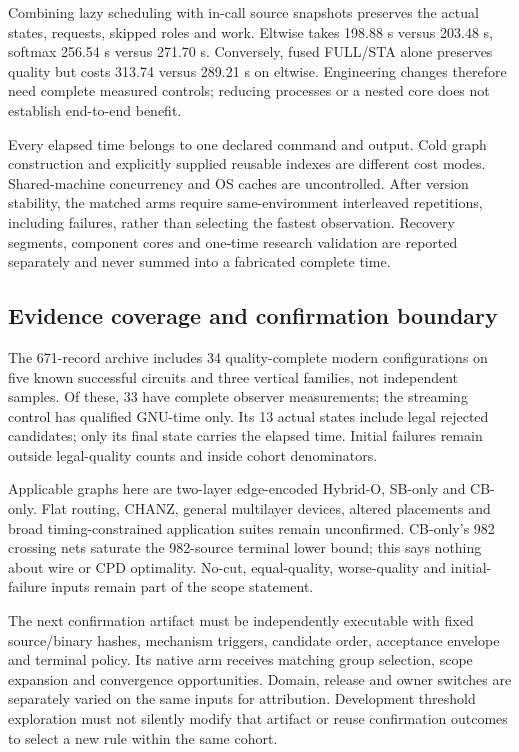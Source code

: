 \documentclass[conference,10pt]{IEEEtran}
\begin{document}
Combining lazy scheduling with in-call source snapshots preserves the actual states, requests, skipped roles and work. Eltwise takes 198.88 s versus 203.48 s, softmax 256.54 s versus 271.70 s. Conversely, fused FULL/STA alone preserves quality but costs 313.74 versus 289.21 s on eltwise. Engineering changes therefore need complete measured controls; reducing processes or a nested core does not establish end-to-end benefit.

Every elapsed time belongs to one declared command and output. Cold graph construction and explicitly supplied reusable indexes are different cost modes. Shared-machine concurrency and OS caches are uncontrolled. After version stability, the matched arms require same-environment interleaved repetitions, including failures, rather than selecting the fastest observation. Recovery segments, component cores and one-time research validation are reported separately and never summed into a fabricated complete time.

\subsection{Evidence coverage and confirmation boundary}
The 671-record archive includes 34 quality-complete modern configurations on five known successful circuits and three vertical families, not independent samples. Of these, 33 have complete observer measurements; the streaming control has qualified GNU-time only. Its 13 actual states include legal rejected candidates; only its final state carries the elapsed time. Initial failures remain outside legal-quality counts and inside cohort denominators.

Applicable graphs here are two-layer edge-encoded Hybrid-O, SB-only and CB-only. Flat routing, CHANZ, general multilayer devices, altered placements and broad timing-constrained application suites remain unconfirmed. CB-only's 982 crossing nets saturate the 982-source terminal lower bound; this says nothing about wire or CPD optimality. No-cut, equal-quality, worse-quality and initial-failure inputs remain part of the scope statement.

The next confirmation artifact must be independently executable with fixed source/binary hashes, mechanism triggers, candidate order, acceptance envelope and terminal policy. Its native arm receives matching group selection, scope expansion and convergence opportunities. Domain, release and owner switches are separately varied on the same inputs for attribution. Development threshold exploration must not silently modify that artifact or reuse confirmation outcomes to select a new rule within the same cohort.
\end{document}
